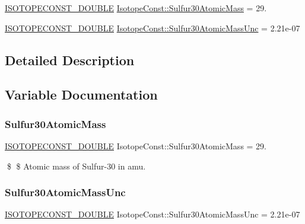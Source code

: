 \begin{DoxyCompactItemize}
\item 
\mbox{\hyperlink{group___isotope_const-_macros_ga8f45a7272ce02c0b4c65c44636ed719a}{I\+S\+O\+T\+O\+P\+E\+C\+O\+N\+S\+T\+\_\+\+D\+O\+U\+B\+LE}} \mbox{\hyperlink{group___isotope_const-_sulfur-_s30_ga46130b70e3ca0b3598aa8d8baaeaf433}{Isotope\+Const\+::\+Sulfur30\+Atomic\+Mass}} = 29.
\item 
\mbox{\hyperlink{group___isotope_const-_macros_ga8f45a7272ce02c0b4c65c44636ed719a}{I\+S\+O\+T\+O\+P\+E\+C\+O\+N\+S\+T\+\_\+\+D\+O\+U\+B\+LE}} \mbox{\hyperlink{group___isotope_const-_sulfur-_s30_ga25b98abc6e00e145ee1ded3de8b95b7f}{Isotope\+Const\+::\+Sulfur30\+Atomic\+Mass\+Unc}} = 2.\+21e-\/07
\end{DoxyCompactItemize}


\subsection{Detailed Description}


\subsection{Variable Documentation}
\mbox{\label{group___isotope_const-_sulfur-_s30_ga46130b70e3ca0b3598aa8d8baaeaf433}} 
\subsubsection{\texorpdfstring{Sulfur30\+Atomic\+Mass}{Sulfur30AtomicMass}}
{\footnotesize\ttfamily \mbox{\hyperlink{group___isotope_const-_macros_ga8f45a7272ce02c0b4c65c44636ed719a}{I\+S\+O\+T\+O\+P\+E\+C\+O\+N\+S\+T\+\_\+\+D\+O\+U\+B\+LE}} Isotope\+Const\+::\+Sulfur30\+Atomic\+Mass = 29.}

\$ \$ Atomic mass of Sulfur-\/30 in amu. \mbox{\label{group___isotope_const-_sulfur-_s30_ga25b98abc6e00e145ee1ded3de8b95b7f}} 
\subsubsection{\texorpdfstring{Sulfur30\+Atomic\+Mass\+Unc}{Sulfur30AtomicMassUnc}}
{\footnotesize\ttfamily \mbox{\hyperlink{group___isotope_const-_macros_ga8f45a7272ce02c0b4c65c44636ed719a}{I\+S\+O\+T\+O\+P\+E\+C\+O\+N\+S\+T\+\_\+\+D\+O\+U\+B\+LE}} Isotope\+Const\+::\+Sulfur30\+Atomic\+Mass\+Unc = 2.\+21e-\/07}

